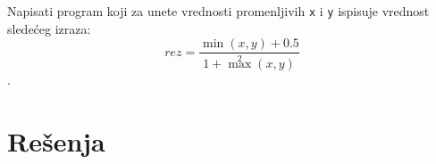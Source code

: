 \begin{Exercise}[label=p1_22]
Napisati program koji za unete vrednosti promenljivih \verb|x| i
\verb|y| ispisuje vrednost sledećeg izraza:
$$rez = \frac{\min(x, y) + 0.5}{1 + \max^2(x, y)}$$. \\
\end{Exercise}
\begin{Answer}[ref=p1_22]
\end{Answer}



\section{Rešenja}
\shipoutAnswer
